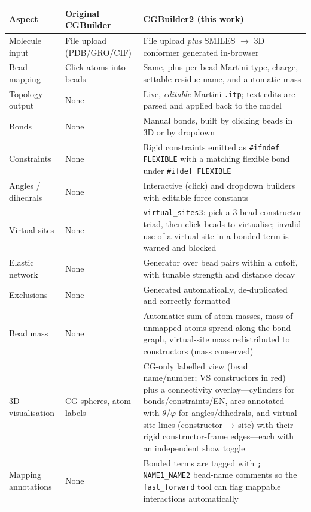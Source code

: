 \documentclass[11pt]{article}
\begin{document}
\begin{table}[h]
\centering
\scriptsize
\begin{tabularx}{\textwidth}{@{}l Y Y@{}}
\toprule
\textbf{Aspect} & \textbf{Original CGBuilder} & \textbf{CGBuilder2 (this work)} \\
\midrule
Molecule input      & File upload (PDB/GRO/CIF) & File upload \emph{plus} SMILES $\rightarrow$ 3D conformer generated in-browser \\
Bead mapping        & Click atoms into beads & Same, plus per-bead Martini type, charge, settable residue name, and automatic mass \\
Topology output     & None & Live, \emph{editable} Martini \texttt{.itp}; text edits are parsed and applied back to the model \\
Bonds               & None & Manual bonds, built by clicking beads in 3D or by dropdown \\
Constraints         & None & Rigid constraints emitted as \texttt{\#ifndef FLEXIBLE} with a matching flexible bond under \texttt{\#ifdef FLEXIBLE} \\
Angles / dihedrals  & None & Interactive (click) and dropdown builders with editable force constants \\
Virtual sites       & None & \texttt{virtual\_sites3}: pick a 3-bead constructor triad, then click beads to virtualise; invalid use of a virtual site in a bonded term is warned and blocked \\
Elastic network     & None & Generator over bead pairs within a cutoff, with tunable strength and distance decay \\
Exclusions          & None & Generated automatically, de-duplicated and correctly formatted \\
Bead mass           & None & Automatic: sum of atom masses, mass of unmapped atoms spread along the bond graph, virtual-site mass redistributed to constructors (mass conserved) \\
3D visualisation    & CG spheres, atom labels & CG-only labelled view (bead name/number; VS constructors in red) plus a connectivity overlay---cylinders for bonds/constraints/EN, arcs annotated with $\theta$/$\varphi$ for angles/dihedrals, and virtual-site lines (constructor\,$\rightarrow$\,site) with their rigid constructor-frame edges---each with an independent show toggle \\
Mapping annotations & None & Bonded terms are tagged with \texttt{; NAME1\_NAME2} bead-name comments so the \texttt{fast\_forward} tool can flag mappable interactions automatically \\

\end{tabularx}
\end{table}
\end{document}
